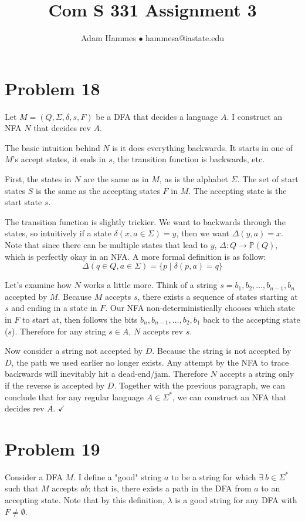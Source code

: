 \documentclass[11pt]{article}
\begin{document}
\title{Com S 331 Assignment 3}
\author{Adam Hammes $\bullet$ hammesa@iastate.edu }
\maketitle

\section*{Problem 18}
Let $M = (Q, \Sigma, \delta, s, F)$ be a DFA that decides a language $A$. I construct an NFA $N$ that decides rev $ A$.

The basic intuition behind $N$ is it does everything backwards. It starts in one of $M$'s accept states, it ends in $s$, the transition function is backwards, etc.

First, the states in $N$ are the same as in $M$, as is the alphabet $\Sigma$. The set of start states $S$ is the same as the accepting states $F$ in $M$. The accepting state is the start state $s$.

The transition function is slightly trickier. We want to backwards through the states, so intuitively if a state $\delta(x, a \in \Sigma) = y$, then we want $\Delta(y, a) = x$. Note that since there can be multiple states that lead to $y$, $\Delta : Q \rightarrow \mathbb{P}(Q)$, which is perfectly okay in an NFA. A more formal definition is as follow:
	\[ \Delta(q \in Q, a \in \Sigma) = \{ p \mid \delta(p, a ) = q \} \]
	
Let's examine how $N$ works a little more. Think of a string $s= b_1, b_2, \dots, b_{n-1}, b_n$ accepted by $M$. Because $M$ accepts $s$, there exists a sequence of states starting at $s$ and ending in a state in $F$. Our NFA non-deterministically chooses which state in $F$ to start at, then follows the bits $b_n, b_{n-1}, \dots, b_2, b_1$ back to the accepting state ($s$). Therefore for any string $s \in A$, $N$ accepts rev $s$.

Now consider a string not accepted by $D$. Because the string is not accepted by $D$, the path we used earlier no longer exists. Any attempt by the NFA to trace backwards will inevitably hit a dead-end/jam. Therefore $N$ accepts a string only if the reverse is accepted by $D$. Together with the previous paragraph, we can conclude that for any regular language $A \in \Sigma^*$, we can construct an NFA that decides rev $A$. $\checkmark$



\section*{Problem 19}
Consider a DFA $M$. I define a "good" string $a$ to be a string for which $ \exists\ b \in \Sigma^*$ such that $M$ accepts $ab$; that is, there exists a path in the DFA from $a$ to an accepting state. Note that by this definition, $\lambda$ is a good string for any DFA with $F \neq \emptyset$.
\end{document}

